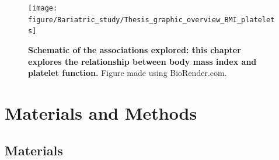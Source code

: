 \documentclass[11pt,twoside]{bristolthesis}
\begin{document}
\begin{figure}
\texttt{[image: figure/Bariatric\_study/Thesis\_graphic\_overview\_BMI\_platelets]} \caption[Schematic of the associations explored in the current chapter]{\textbf{Schematic of the associations explored: this chapter explores the relationship between body mass index and platelet function.} Figure made using BioRender.com.}\label{fig:BMI-platelet-overview2}
\end{figure}
\hypertarget{materials-and-methods}{%
\section{Materials and Methods}\label{materials-and-methods}}

\hypertarget{materials}{%
\subsection{Materials}\label{materials}}
\end{document}
